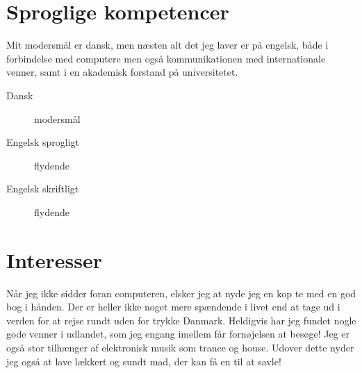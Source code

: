 \documentclass[margin,line,a4paper]{resume}
\begin{document}
\begin{resume}
\section{\mysidestyle Sproglige kompetencer}
Mit modersmål er dansk, men næsten alt det jeg laver er på engelsk, både
i forbindelse med computere men også kommunikationen med internationale
venner, samt i en akademisk forstand på universitetet.

\begin{description}
  \item[Dansk] modersmål
  \item[Engelsk sprogligt] flydende
  \item[Engelsk skriftligt] flydende
\end{description}

\section{\mysidestyle Interesser}
Når jeg ikke sidder foran computeren, elsker jeg at nyde jeg en kop
te med en god bog i hånden. Der er heller ikke noget mere spændende
i livet end at tage ud i verden for at rejse rundt uden for trykke
Danmark. Heldigvis har jeg fundet nogle gode venner i udlandet, som jeg
engang imellem får fornøjelsen at besøge! Jeg er også stor tilhænger af
elektronisk musik som trance og house. Udover dette nyder jeg også at
lave lækkert og sundt mad, der kan få en til at savle!

\end{resume}
\end{document}

